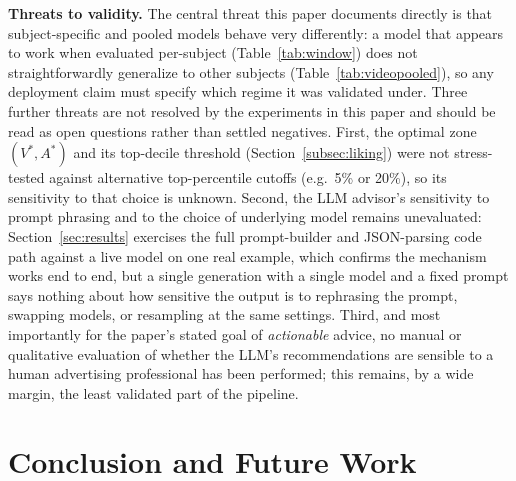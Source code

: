 \documentclass[conference]{IEEEtran}
\begin{document}
\textbf{Threats to validity.} The central threat this paper documents
directly is that subject-specific and pooled models behave very
differently: a model that appears to work when evaluated per-subject
(Table~\ref{tab:window}) does not straightforwardly generalize to other
subjects (Table~\ref{tab:videopooled}), so any deployment claim must
specify which regime it was validated under. Three further threats are
not resolved by the experiments in this paper and should be read as open
questions rather than settled negatives. First, the optimal zone
$(V^{*},A^{*})$ and its top-decile threshold (Section~\ref{subsec:liking})
were not stress-tested against alternative top-percentile cutoffs (e.g.\
5\% or 20\%), so its sensitivity to that choice is unknown. Second, the
LLM advisor's sensitivity to prompt phrasing and to the choice of
underlying model remains unevaluated: Section~\ref{sec:results} exercises
the full prompt-builder and JSON-parsing code path against a live model
on one real example, which confirms the mechanism works end to end, but a
single generation with a single model and a fixed prompt says nothing
about how sensitive the output is to rephrasing the prompt, swapping
models, or resampling at the same settings. Third, and most
importantly for the paper's stated goal of \emph{actionable} advice, no
manual or qualitative evaluation of whether the LLM's recommendations are
sensible to a human advertising professional has been performed; this
remains, by a wide margin, the least validated part of the pipeline.

\section{Conclusion and Future Work}
\label{sec:conclusion}
\end{document}
